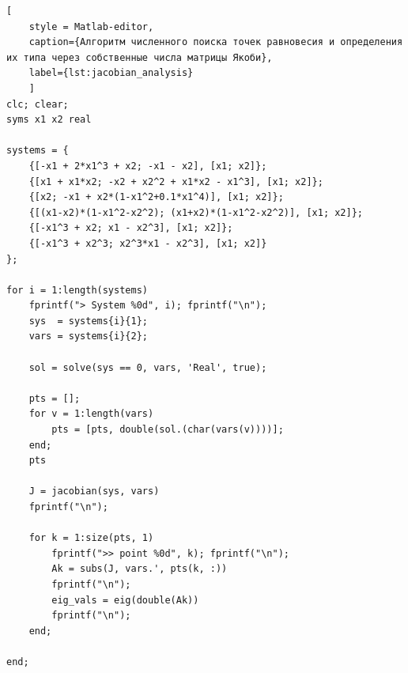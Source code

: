 \documentclass[a4paper,12pt]{article}
\begin{document}
\begin{lstlisting}[
	style = Matlab-editor, 
	caption={Алгоритм численного поиска точек равновесия и определения их типа через собственные числа матрицы Якоби}, 
	label={lst:jacobian_analysis}
	]	
clc; clear;
syms x1 x2 real

systems = {
	{[-x1 + 2*x1^3 + x2; -x1 - x2], [x1; x2]};
	{[x1 + x1*x2; -x2 + x2^2 + x1*x2 - x1^3], [x1; x2]};
	{[x2; -x1 + x2*(1-x1^2+0.1*x1^4)], [x1; x2]};
	{[(x1-x2)*(1-x1^2-x2^2); (x1+x2)*(1-x1^2-x2^2)], [x1; x2]};
	{[-x1^3 + x2; x1 - x2^3], [x1; x2]};
	{[-x1^3 + x2^3; x2^3*x1 - x2^3], [x1; x2]}
};

for i = 1:length(systems)
	fprintf("> System %0d", i); fprintf("\n");
	sys  = systems{i}{1};
	vars = systems{i}{2}; 
	
	sol = solve(sys == 0, vars, 'Real', true);
	
	pts = [];
	for v = 1:length(vars)
		pts = [pts, double(sol.(char(vars(v))))];
	end;
	pts
	
	J = jacobian(sys, vars)
	fprintf("\n");
	
	for k = 1:size(pts, 1)
		fprintf(">> point %0d", k); fprintf("\n");
		Ak = subs(J, vars.', pts(k, :)) 
		fprintf("\n");
		eig_vals = eig(double(Ak))
		fprintf("\n");
	end;

end;
\end{lstlisting}
\end{document}

